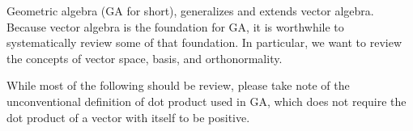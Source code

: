 %
%
Geometric algebra (GA for short), generalizes and extends vector algebra.  Because vector algebra is the foundation for GA, it is worthwhile to systematically review some of that foundation.  In particular, we want to review the concepts of vector space, basis, and orthonormality.

While most of the following should be review, please take note of the unconventional definition of dot product used in GA, which does not require the dot product of a vector with itself to be positive.

